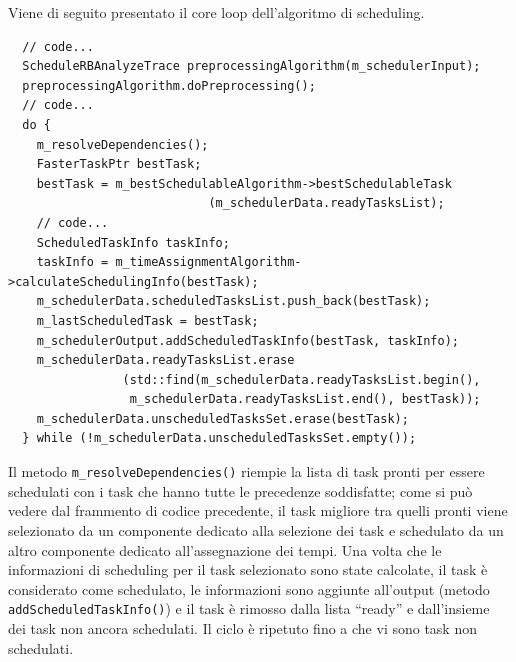 Viene di seguito presentato il core loop dell'algoritmo di scheduling.
\newline
\begin{verbatim}
  // code...
  ScheduleRBAnalyzeTrace preprocessingAlgorithm(m_schedulerInput);
  preprocessingAlgorithm.doPreprocessing();
  // code...
  do {
    m_resolveDependencies();
    FasterTaskPtr bestTask;
    bestTask = m_bestSchedulableAlgorithm->bestSchedulableTask 
                            (m_schedulerData.readyTasksList);
    // code...
    ScheduledTaskInfo taskInfo;
    taskInfo = m_timeAssignmentAlgorithm->calculateSchedulingInfo(bestTask);
    m_schedulerData.scheduledTasksList.push_back(bestTask);
    m_lastScheduledTask = bestTask;
    m_schedulerOutput.addScheduledTaskInfo(bestTask, taskInfo);
    m_schedulerData.readyTasksList.erase 
                (std::find(m_schedulerData.readyTasksList.begin(), 
                 m_schedulerData.readyTasksList.end(), bestTask));
    m_schedulerData.unscheduledTasksSet.erase(bestTask);
  } while (!m_schedulerData.unscheduledTasksSet.empty());
\end{verbatim}

Il metodo \verb+m_resolveDependencies()+ riempie la lista di task pronti per 
essere schedulati con i task che hanno tutte le precedenze soddisfatte; come si 
può vedere dal frammento di codice precedente, il task migliore tra quelli 
pronti viene selezionato da un componente dedicato alla selezione dei task e 
schedulato da un altro componente dedicato all'assegnazione dei tempi. Una 
volta che le informazioni di scheduling per il task selezionato sono state 
calcolate, il task è considerato come schedulato, le informazioni sono aggiunte 
all'output (metodo \verb+addScheduledTaskInfo()+) e il task è rimosso dalla 
lista ``ready'' e dall'insieme dei task non ancora schedulati. Il ciclo è 
ripetuto fino a che vi sono task non schedulati.

